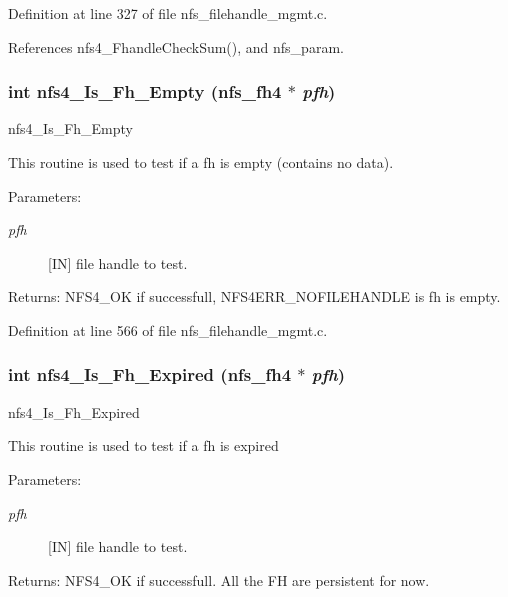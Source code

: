 Definition at line 327 of file nfs\_\-filehandle\_\-mgmt.c.

References nfs4\_\-Fhandle\-Check\-Sum(), and nfs\_\-param.
\subsubsection{\setlength{\rightskip}{0pt plus 5cm}int nfs4\_\-Is\_\-Fh\_\-Empty (nfs\_\-fh4 $\ast$ {\em pfh})}\label{nfs__filehandle__mgmt_8c_a11}


nfs4\_\-Is\_\-Fh\_\-Empty

This routine is used to test if a fh is empty (contains no data).

\begin{Desc}
\item[Parameters:]
\begin{description}
\item[{\em pfh}][IN] file handle to test.\end{description}
\end{Desc}
\begin{Desc}
\item[Returns:]NFS4\_\-OK if successfull, NFS4ERR\_\-NOFILEHANDLE is fh is empty. \end{Desc}


Definition at line 566 of file nfs\_\-filehandle\_\-mgmt.c.
\subsubsection{\setlength{\rightskip}{0pt plus 5cm}int nfs4\_\-Is\_\-Fh\_\-Expired (nfs\_\-fh4 $\ast$ {\em pfh})}\label{nfs__filehandle__mgmt_8c_a13}


nfs4\_\-Is\_\-Fh\_\-Expired

This routine is used to test if a fh is expired

\begin{Desc}
\item[Parameters:]
\begin{description}
\item[{\em pfh}][IN] file handle to test.\end{description}
\end{Desc}
\begin{Desc}
\item[Returns:]NFS4\_\-OK if successfull. All the FH are persistent for now. \end{Desc}


